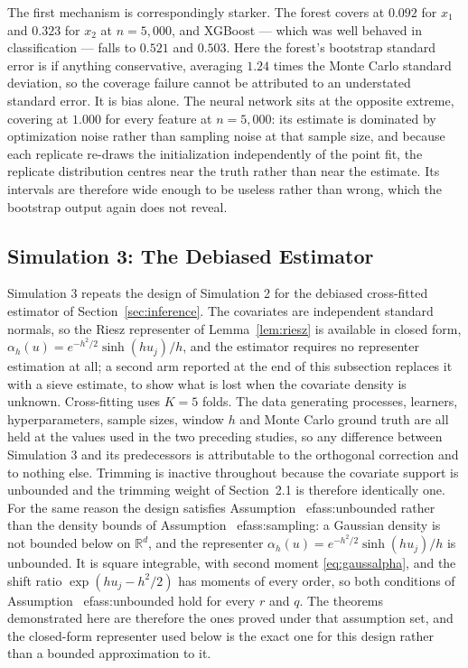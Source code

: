 \documentclass[12pt]{article}
\newcommand{\R}{\mathbb{R}}
\begin{document}
	The first mechanism is correspondingly starker. The forest covers at $0.092$ for $x_1$ and $0.323$ for $x_2$ at $n=5{,}000$, and XGBoost --- which was well behaved in classification --- falls to $0.521$ and $0.503$. Here the forest's bootstrap standard error is if anything conservative, averaging $1.24$ times the Monte Carlo standard deviation, so the coverage failure cannot be attributed to an understated standard error. It is bias alone. The neural network sits at the opposite extreme, covering at $1.000$ for every feature at $n=5{,}000$: its estimate is dominated by optimization noise rather than sampling noise at that sample size, and because each replicate re-draws the initialization independently of the point fit, the replicate distribution centres near the truth rather than near the estimate. Its intervals are therefore wide enough to be useless rather than wrong, which the bootstrap output again does not reveal.
	
	\subsection{Simulation 3: The Debiased Estimator}
	
	Simulation 3 repeats the design of Simulation 2 for the debiased cross-fitted estimator of Section~\ref{sec:inference}. The covariates are independent standard normals, so the Riesz representer of Lemma~\ref{lem:riesz} is available in closed form, $\alpha_h(u) = e^{-h^2/2}\sinh(h u_j)/h$, and the estimator requires no representer estimation at all; a second arm reported at the end of this subsection replaces it with a sieve estimate, to show what is lost when the covariate density is unknown. Cross-fitting uses $K=5$ folds. The data generating processes, learners, hyperparameters, sample sizes, window $h$ and Monte Carlo ground truth are all held at the values used in the two preceding studies, so any difference between Simulation 3 and its predecessors is attributable to the orthogonal correction and to nothing else. Trimming is inactive throughout because the covariate support is unbounded and the trimming weight of Section~2.1 is therefore identically one. For the same reason the design satisfies Assumption~
ef{ass:unbounded} rather than the density bounds of Assumption~
ef{ass:sampling}: a Gaussian density is not bounded below on $\R^d$, and the representer $\alpha_h(u) = e^{-h^2/2}\sinh(h u_j)/h$ is unbounded. It is square integrable, with second moment \eqref{eq:gaussalpha}, and the shift ratio $\exp(h u_j - h^2/2)$ has moments of every order, so both conditions of Assumption~
ef{ass:unbounded} hold for every $r$ and $q$. The theorems demonstrated here are therefore the ones proved under that assumption set, and the closed-form representer used below is the exact one for this design rather than a bounded approximation to it.
	
\end{document}
